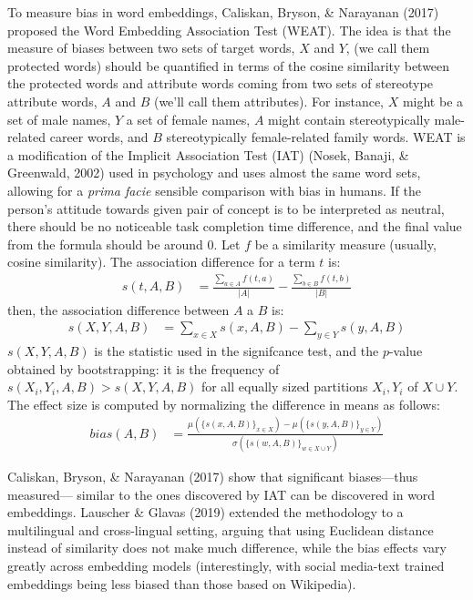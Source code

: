 \documentclass[
  10pt,
  dvipsnames,enabledeprecatedfontcommands]{scrartcl}
\begin{document}
To measure bias in word embeddings, Caliskan, Bryson, \& Narayanan
(2017) proposed the Word Embedding Association Test (WEAT). The idea is
that the measure of biases between two sets of target words, \(X\) and
\(Y\), (we call them protected words) should be quantified in terms of
the cosine similarity between the protected words and attribute words
coming from two sets of stereotype attribute words, \(A\) and \(B\)
(we'll call them attributes). For instance, \(X\) might be a set of male
names, \(Y\) a set of female names, \(A\) might contain stereotypically
male-related career words, and \(B\) stereotypically female-related
family words. WEAT is a modification of the Implicit Association Test
(IAT) (Nosek, Banaji, \& Greenwald, 2002) used in psychology and uses
almost the same word sets, allowing for a \emph{prima facie} sensible
comparison with bias in humans. If the person's attitude towards given
pair of concept is to be interpreted as neutral, there should be no
noticeable task completion time difference, and the final value from the
formula should be around 0. Let \(f\) be a similarity measure (usually,
cosine similarity). The association difference for a term \(t\) is:
\begin{align}
s(t,A,B) & = \frac{\sum_{a\in A}f(t,a)}{\vert A\vert} - \frac{\sum_{b\in B}f(t,b)}{\vert B\vert}
\end{align} \noindent then, the association difference between \(A\) a
\(B\) is: \begin{align}
s(X,Y,A,B) & = \sum_{x\in X} s(x,A,B) -  \sum_{y\in Y} s(y,A,B)
\end{align} \noindent \(s(X,Y,A,B)\) is the statistic used in the
signifcance test, and the \(p\)-value obtained by bootstrapping: it is
the frequency of \(s(X_i,Y_i,A,B)>s(X,Y,A,B)\) for all equally sized
partitions \(X_i, Y_i\) of \(X\cup Y\). The effect size is computed by
normalizing the difference in means as follows: \begin{align}
bias(A,B) & = \frac{
\mu(\{s(x,A,B)\}_{x\in X}) -\mu(\{s(y,A,B)\}_{y\in Y}) 
}{
\sigma(\{s(w,A,B)\}_{w\in X\cup Y})
}
\end{align}

Caliskan, Bryson, \& Narayanan (2017) show that significant
biases---thus measured--- similar to the ones discovered by IAT can be
discovered in word embeddings. Lauscher \& Glavas (2019) extended the
methodology to a multilingual and cross-lingual setting, arguing that
using Euclidean distance instead of similarity does not make much
difference, while the bias effects vary greatly across embedding models
(interestingly, with social media-text trained embeddings being less
biased than those based on Wikipedia).
\end{document}
